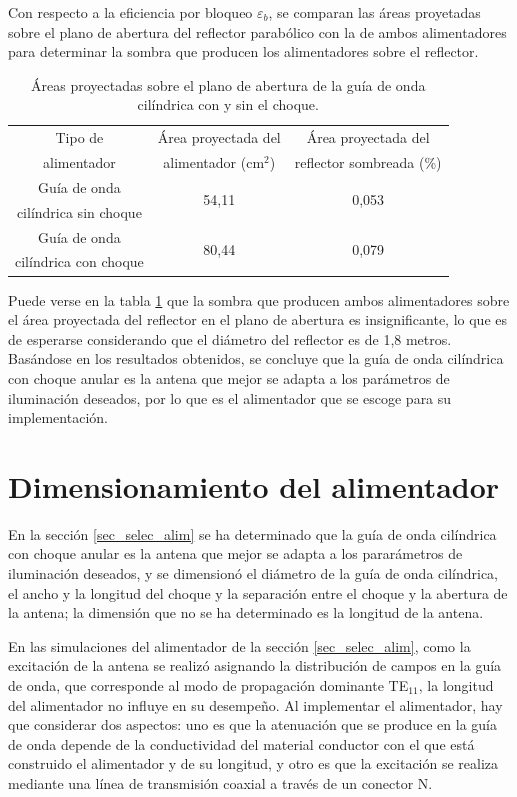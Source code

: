 Con respecto a la eficiencia por bloqueo $\varepsilon_b$, se comparan las áreas proyetadas sobre el plano de abertura del reflector parabólico con la de ambos alimentadores para determinar la sombra que producen los alimentadores sobre el reflector.
\begin{table}[H]
\centering
\begin{tabular}{|c|c|c|}
\hline
Tipo de & Área proyectada del & Área proyectada del\\
alimentador & alimentador (cm$^2$) & reflector sombreada (\%) \\
\hline
Guía de onda & \multirow{2}{*}{54,11} & \multirow{2}{*}{0,053} \\
cilíndrica sin choque & & \\
\hline
Guía de onda & \multirow{2}{*}{80,44} & \multirow{2}{*}{0,079} \\
cilíndrica con choque & & \\
\hline
\end{tabular}
\caption{Áreas proyectadas sobre el plano de abertura de la guía de onda cilíndrica con y sin el choque.}
\label{tabla_estudio:16}
\end{table}
Puede verse en la tabla \ref{tabla_estudio:16} que la sombra que producen ambos alimentadores sobre el área proyectada del reflector en el plano de abertura es insignificante, lo que es de esperarse considerando que el diámetro del reflector es de 1,8 metros. Basándose en los resultados obtenidos, se concluye que la guía de onda cilíndrica con choque anular es la antena que mejor se adapta a los parámetros de iluminación deseados, por lo que es el alimentador que se escoge para su implementación.

\section{Dimensionamiento del alimentador}
\label{sec_estudio_dimen}

En la sección \ref{sec_selec_alim} se ha determinado que la guía de onda cilíndrica con choque anular es la antena que mejor se adapta a los pararámetros de iluminación deseados, y se dimensionó el diámetro de la guía de onda cilíndrica, el ancho y la longitud del choque y la separación entre el choque y la abertura de la antena; la dimensión que no se ha determinado es la longitud de la antena.

En las simulaciones del alimentador de la sección \ref{sec_selec_alim}, como la excitación de la antena se realizó asignando la distribución de campos en la guía de onda, que corresponde al modo de propagación dominante TE$_{11}$, la longitud del alimentador no influye en su desempeño. Al implementar el alimentador, hay que considerar dos aspectos: uno es que la atenuación que se produce en la guía de onda depende de la conductividad del material conductor con el que está construido el alimentador y de su longitud, y otro es que la excitación se realiza mediante una línea de transmisión coaxial a través de un conector N.

